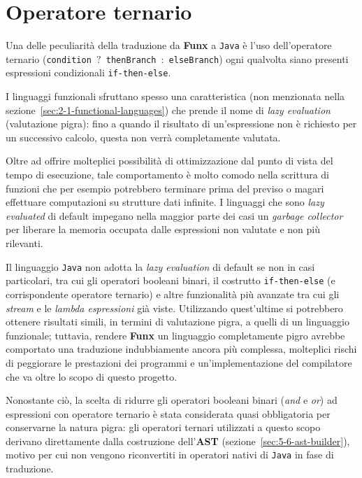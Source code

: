 \section{Operatore ternario}
\label{sec:4-2-ternary-operator}

Una delle peculiarità della traduzione da \textbf{Funx} a \texttt{Java} è l'uso dell'operatore ternario
(\texttt{condition $\mathord{?}$ thenBranch $\mathord{:}$ elseBranch}) ogni qualvolta
siano presenti espressioni condizionali \texttt{if-then-else}.


I linguaggi funzionali sfruttano spesso una caratteristica (non menzionata nella sezione~\ref{sec:2-1-functional-languages})
che prende il nome di \textit{lazy evaluation} (valutazione pigra): fino a quando il risultato di un'espressione
non è richiesto per un successivo calcolo, questa non verrà completamente valutata.

\noindent Oltre ad offrire molteplici possibilità di ottimizzazione dal punto di vista del tempo di esecuzione,
tale comportamento è molto comodo nella scrittura di funzioni che per esempio potrebbero terminare
prima del previso o magari effettuare computazioni su strutture dati infinite.
I linguaggi che sono \textit{lazy evaluated} di default impegano nella maggior parte dei casi un \textit{garbage collector}
per liberare la memoria occupata dalle espressioni non valutate e non più rilevanti.


Il linguaggio \texttt{Java} non adotta la \textit{lazy evaluation} di default se non in casi particolari, tra cui
gli operatori booleani binari, il costrutto \texttt{if-then-else} (e corrispondente operatore ternario) e altre
funzionalità più avanzate tra cui gli \textit{stream} e le \textit{lambda espressioni} già viste.
Utilizzando quest'ultime si potrebbero ottenere risultati simili, in termini di valutazione pigra, a quelli di un linguaggio funzionale;
tuttavia, rendere \textbf{Funx} un linguaggio completamente pigro avrebbe comportato una traduzione indubbiamente ancora più complessa,
molteplici rischi di peggiorare le prestazioni dei programmi e un'implementazione del compilatore che va oltre lo scopo di questo progetto.


Nonostante ciò, la scelta di ridurre gli operatori booleani binari (\textit{and} e \textit{or}) ad espressioni con operatore ternario
è stata considerata quasi obbligatoria per conservarne la natura pigra: gli operatori ternari utilizzati a questo scopo
derivano direttamente dalla costruzione dell'\textbf{AST} (sezione~\ref{sec:5-6-ast-builder}), motivo per cui non vengono riconvertiti
in operatori nativi di \texttt{Java} in fase di traduzione.


